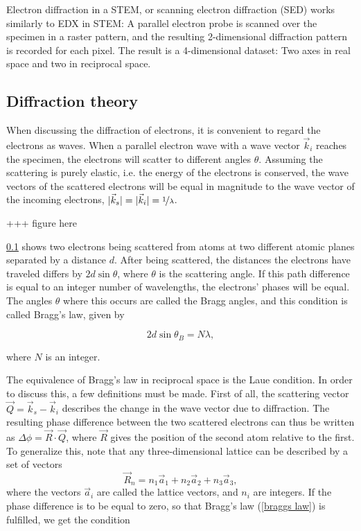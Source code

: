 Electron diffraction in a STEM, or scanning electron diffraction (SED) works similarly to EDX in STEM: A parallel electron probe is scanned over the specimen in a raster pattern, and the resulting 2-dimensional diffraction pattern is recorded for each pixel. The result is a 4-dimensional dataset: Two axes in real space and two in reciprocal space.

	\subsection{Diffraction theory}
When discussing the diffraction of electrons, it is convenient to regard the electrons as waves. When a parallel electron wave with a wave vector $\vec{k}_i$ reaches the specimen, the electrons will scatter to different angles $\theta$. Assuming the scattering is purely elastic, i.e. the energy of the electrons is conserved, the wave vectors of the scattered electrons will be equal in magnitude to the wave vector of the incoming electrons, $\vert \vec{k}_s \vert = \vert \vec{k}_i \vert = \nicefrac{1}{\lambda}$.

+++ figure here

\cref{} shows two electrons being scattered from atoms at two different atomic planes separated by a distance $d$. After being scattered, the distances the electrons have traveled differs by $2d \sin \theta$, where $\theta$ is the scattering angle. If this path difference is equal to an integer number of wavelengths, the electrons' phases will be equal. The angles $\theta$ where this occurs are called the Bragg angles, and this condition is called Bragg's law, given by

\begin{equation}
\label{braggs law}
2 d \sin \theta_B = N\lambda,
\end{equation}

where $N$ is an integer.

The equivalence of Bragg's law in reciprocal space is the Laue condition. In order to discuss this, a few definitions must be made. First of all, the scattering vector $\vec{Q}=\vec{k}_s-\vec{k}_i$ describes the change in the wave vector due to diffraction. The resulting phase difference between the two scattered electrons can thus be written as $\Delta \phi = \vec{R} \cdot \vec{Q}$, where $\vec{R}$ gives the position of the second atom relative to the first. To generalize this, note that any three-dimensional lattice can be described by a set of vectors
\begin{equation}
\label{eq:real-lattice}
\vec{R}_n=n_1 \vec{a}_1 + n_2 \vec{a}_2 + n_3 \vec{a}_3,
\end{equation}
where the vectors $\vec{a}_i$ are called the lattice vectors, and $n_i$ are integers. If the phase difference is to be equal to zero, so that Bragg's law (\cref{braggs law}) is fulfilled, we get the condition

